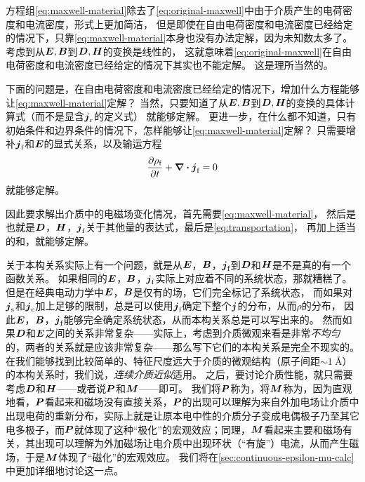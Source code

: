 方程组\eqref{eq:maxwell-material}除去了\eqref{eq:original-maxwell}中由于介质产生的电荷密度和电流密度，形式上更加简洁，
但是即使在自由电荷密度和电流密度已经给定的情况下，只靠\eqref{eq:maxwell-material}本身也没有办法定解，因为未知数太多了。
考虑到从$\vb*{E}, \vb*{B}$到$\vb*{D}, \vb*{H}$的变换是线性的，
这就意味着\eqref{eq:original-maxwell}在自由电荷密度和电流密度已经给定的情况下其实也不能定解。
这是理所当然的。

下面的问题是，在自由电荷密度和电流密度已经给定的情况下，增加什么方程能够让\eqref{eq:maxwell-material}定解？
当然，只要知道了从$\vb*{E}, \vb*{B}$到$\vb*{D}, \vb*{H}$的变换的具体计算式（而不是显含$\vb*{j}_\text{r}$的定义式）
就能够定解。
更进一步，在什么都不知道，只有初始条件和边界条件的情况下，怎样能够让\eqref{eq:maxwell-material}定解？
只需要增补$\vb*{j}_\text{f}$和$\vb*{E}$的显式关系，以及输运方程
\begin{equation}
    \pdv{\rho_\text{f}}{t} + \div{\vb*{j}_\text{f}} = 0
    \label{eq:transportation}
\end{equation}
就能够定解。

因此要求解出介质中的电磁场变化情况，首先需要\eqref{eq:maxwell-material}，
然后是也就是$\vb*{D}$，$\vb*{H}$，$\vb*{j}_\text{f}$关于其他量的表达式，最后是\eqref{eq:transportation}，
再加上适当的和，就能够定解。

关于本构关系实际上有一个问题，就是从$\vb*{E}$，$\vb*{B}$，$\vb*{j}_\text{f}$到$\vb*{D}$和$\vb*{H}$是不是真的有一个函数关系。
如果相同的$\vb*{E}$，$\vb*{B}$，$\vb*{j}_\text{f}$实际上对应着不同的系统状态，那就糟糕了。
但是在经典电动力学中$\vb*{E}$，$\vb*{B}$是仅有的场，它们完全标记了系统状态，
而如果对$\vb*{j}_\text{s}$和$\vb*{j}_\text{c}$加上足够的限制，总是可以使用$\vb*{j}_\text{f}$确定下整个$\vb*{j}$的分布，从而$\rho$的分布，
因此$\vb*{E}$，$\vb*{B}$，$\vb*{j}_\text{f}$能够完全确定系统状态，从而本构关系总是可以写出来的。
然而如果$\vb*{D}$和$\vb*{E}$之间的关系非常复杂——实际上，考虑到介质微观来看是非常\emph{不均匀}的，两者的关系就是应该非常复杂——那么写下它们的本构关系是完全不现实的。
在我们能够找到比较简单的、特征尺度远大于介质的微观结构（原子间距$\sim \SI{1}{\angstrom}$）的本构关系时，我们说，\emph{连续介质近似}适用。
之后，要讨论介质性能，就只需要考虑$\vb*{D}$和$\vb*{H}$——或者说$\vb*{P}$和$\vb*{M}$——即可。
我们将$\vb*{P}$称为，将$\vb*{M}$称为，因为直观地看，$\vb*{P}$看起来和磁场没有直接关系，$\vb*{P}$的出现可以理解为来自外加电场让介质中出现电荷的重新分布，实际上就是让原本电中性的介质分子变成电偶极子乃至其它电多极子，而$\vb*{P}$就体现了这种“极化”的宏观效应；同理，$\vb*{M}$看起来主要和磁场有关，其出现可以理解为外加磁场让电介质中出现环状（“有旋”）电流，从而产生磁场，于是$\vb*{M}$体现了“磁化”的宏观效应。
我们将在\autoref{sec:continuous-epsilon-mu-calc}中更加详细地讨论这一点。

